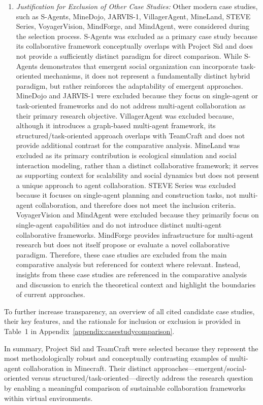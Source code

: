 \documentclass[a4paper, 12pt]{article}
\begin{document}
\begin{enumerate}[label=(\alph*)]
    \item \textit{Justification for Exclusion of Other Case Studies:} Other modern case studies, such as S-Agents, MineDojo, JARVIS-1, VillagerAgent, MineLand, STEVE Series, VoyagerVision, MindForge, and MindAgent, were considered during the selection process. S-Agents was excluded as a primary case study because its collaborative framework conceptually overlaps with Project Sid and does not provide a sufficiently distinct paradigm for direct comparison. While S-Agents demonstrates that emergent social organization can incorporate task-oriented mechanisms, it does not represent a fundamentally distinct hybrid paradigm, but rather reinforces the adaptability of emergent approaches. MineDojo and JARVIS-1 were excluded because they focus on single-agent or task-oriented frameworks and do not address multi-agent collaboration as their primary research objective. VillagerAgent was excluded because, although it introduces a graph-based multi-agent framework, its structured/task-oriented approach overlaps with TeamCraft and does not provide additional contrast for the comparative analysis. MineLand was excluded as its primary contribution is ecological simulation and social interaction modeling, rather than a distinct collaborative framework; it serves as supporting context for scalability and social dynamics but does not present a unique approach to agent collaboration. STEVE Series was excluded because it focuses on single-agent planning and construction tasks, not multi-agent collaboration, and therefore does not meet the inclusion criteria. VoyagerVision and MindAgent were excluded because they primarily focus on single-agent capabilities and do not introduce distinct multi-agent collaborative frameworks. MindForge provides infrastructure for multi-agent research but does not itself propose or evaluate a novel collaborative paradigm. Therefore, these case studies are excluded from the main comparative analysis but referenced for context where relevant. Instead, insights from these case studies are referenced in the comparative analysis and discussion to enrich the theoretical context and highlight the boundaries of current approaches.
\end{enumerate}

To further increase transparency, an overview of all cited candidate case studies, their key features, and the rationale for inclusion or exclusion is provided in Table~1 in Appendix~\ref{appendix:casestudycomparison}.

In summary, Project Sid and TeamCraft were selected because they represent the most methodologically robust and conceptually contrasting examples of multi-agent collaboration in Minecraft. Their distinct approaches---emergent/social-oriented versus structured/task-oriented---directly address the research question by enabling a meaningful comparison of sustainable collaboration frameworks within virtual environments.
\end{document}
